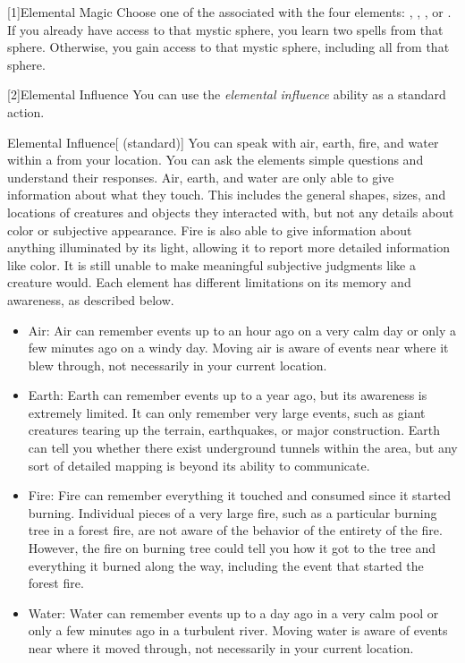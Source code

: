         [1]{Elemental Magic} Choose one of the  associated with the four elements: , , , or .
        If you already have access to that mystic sphere, you learn two spells from that sphere.
        Otherwise, you gain access to that mystic sphere, including all  from that sphere.

        [2]{Elemental Influence} You can use the \textit{elemental influence} ability as a standard action.
        \begin{freeability}{Elemental Influence}[ (standard)]
            You can speak with air, earth, fire, and water within a \areahuge {} from your location.
            You can ask the elements simple questions and understand their responses.
            Air, earth, and water are only able to give information about what they touch.
            This includes the general shapes, sizes, and locations of creatures and objects they interacted with, but not any details about color or subjective appearance.
            Fire is also able to give information about anything illuminated by its light, allowing it to report more detailed information like color.
            It is still unable to make meaningful subjective judgments like a creature would.
            Each element has different limitations on its memory and awareness, as described below.

            \begin{itemize}
                \item Air: Air can remember events up to an hour ago on a very calm day or only a few minutes ago on a windy day.
                    Moving air is aware of events near where it blew through, not necessarily in your current location.
                \item Earth: Earth can remember events up to a year ago, but its awareness is extremely limited.
                    It can only remember very large events, such as giant creatures tearing up the terrain, earthquakes, or major construction.
                    Earth can tell you whether there exist underground tunnels within the area, but any sort of detailed mapping is beyond its ability to communicate.
                \item Fire: Fire can remember everything it touched and consumed since it started burning.
                    Individual pieces of a very large fire, such as a particular burning tree in a forest fire, are not aware of the behavior of the entirety of the fire.
                    However, the fire on burning tree could tell you how it got to the tree and everything it burned along the way, including the event that started the forest fire.
                \item Water: Water can remember events up to a day ago in a very calm pool or only a few minutes ago in a turbulent river.
                    Moving water is aware of events near where it moved through, not necessarily in your current location.
            \end{itemize}
        \end{freeability}

